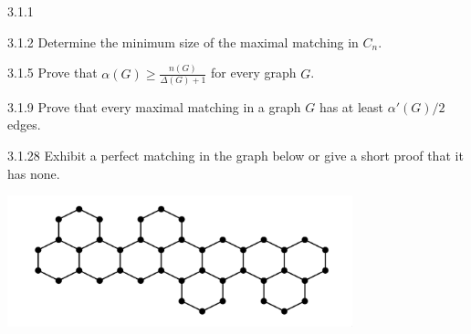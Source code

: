 \documentclass[10pt]{extarticle}
\begin{document}
\begin{problem}{3.1.1}
\begin{center}
    \end{center}
  \end{problem}
  \begin{problem}{3.1.2}
    Determine the minimum size of the maximal matching in $C_n$.
  \end{problem}
  \begin{problem}{3.1.5}
    Prove that $\alpha(G) \geq \frac{n(G)}{\Delta(G)+1}$ for every graph $G$.
  \end{problem}
  \begin{problem}{3.1.9}
    Prove that every maximal matching in a graph $G$ has at least $\alpha'(G)/2$ edges.
  \end{problem}
  \begin{problem}{3.1.28}
    Exhibit a perfect matching in the graph below or give a short proof that it has none. 
    \begin{center}
      \includegraphics[width=10cm]{3_1_28_question}
    \end{center}
  \end{problem}
\end{document}
